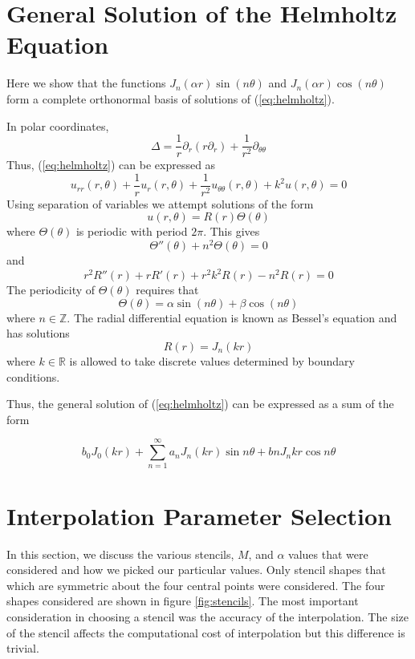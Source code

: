 \documentclass{report}
\begin{document}
\appendix
\chapter{General Solution of the Helmholtz Equation}
\label{sec:helmholtz_basis}
Here we show that the functions $J_{n}(\alpha r) \sin(n \theta)$ and $J_{n}(\alpha r) \cos(n \theta)$ form a complete orthonormal basis of solutions of (\ref{eq:helmholtz}).

In polar coordinates,
\[
\Delta = \frac{1}{r} \partial_{r} (r \partial_{r}) + \frac{1}{r^{2}} \partial_{\theta \theta}
\]
Thus, (\ref{eq:helmholtz}) can be expressed as
\[
u_{rr}(r, \theta) + \frac{1}{r} u_{r}(r, \theta) + \frac{1}{r^{2}} u_{\theta \theta}(r, \theta) + k^2 u(r, \theta) = 0
\]
Using separation of variables we attempt solutions of the form
\[
u(r, \theta) = R(r) \Theta(\theta)
\]
where $\Theta(\theta)$ is periodic with period $2 \pi$. This gives
\[
\Theta''(\theta) + n^{2} \Theta(\theta) = 0
\]
and
\[
r^{2} R''(r) + r R'(r) + r^{2} k^{2} R(r) - n^{2} R(r) = 0
\]
The periodicity of $\Theta(\theta)$ requires that
\[
\Theta(\theta) = \alpha \sin(n \theta) + \beta \cos(n \theta)
\]
where $n \in \mathbb{Z}$.
The radial differential equation is known as Bessel's equation and has solutions
\[
R(r) = J_{n}(k r)
\]
where $k \in \mathbb{R}$ is allowed to take discrete values determined by boundary conditions.

Thus, the general solution of (\ref{eq:helmholtz}) can be expressed as a sum of the form

\begin{equation}
  \label{eq:helmholtz_gen_soln}
  b_{0} J_{0}(kr) + \sum_{n = 1}^{\infty}{a_{n} J_n(kr) \sin{n \theta} + b{n} J_n{kr} \cos{n \theta}}
\end{equation}

\chapter{Interpolation Parameter Selection}
\label{sec:params}
In this section, we discuss the various stencils, $M$, and $\alpha$ values that were considered and how we picked our particular values.
Only stencil shapes that which are symmetric about the four central points were considered. The four shapes considered are shown in figure \ref{fig:stencils}. The most important consideration in choosing a stencil was the accuracy of the interpolation. The size of the stencil affects the computational cost of interpolation but this difference is trivial.
\end{document}
